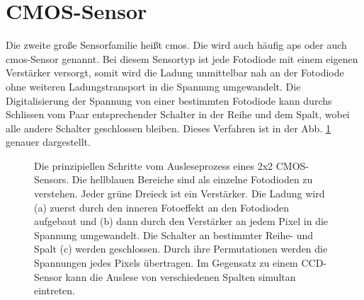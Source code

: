 \section{CMOS-Sensor}
\label{text:cmos_theorie}
Die zweite große Sensorfamilie heißt \gls{cmos}. Die wird auch häufig \gls{aps} oder auch \gls{cmos}-Sensor genannt. Bei diesem Sensortyp ist jede Fotodiode mit einem eigenen Verstärker versorgt, somit wird die Ladung unmittelbar nah an der Fotodiode ohne weiteren Ladungstransport in die Spannung umgewandelt. Die Digitalisierung der Spannung von einer bestimmten Fotodiode kann durchs Schlissen vom Paar entsprechender Schalter in der Reihe und dem Spalt, wobei alle andere Schalter geschlossen bleiben. Dieses Verfahren ist in der Abb. \ref{fig:cmos_scheme} genauer dargestellt.
\begin{figure}[H]
    \centering
    \hfill
    \hfill
    \caption{Die prinzipiellen Schritte vom Ausleseprozess eines 2x2 CMOS-Sensors. Die hellblauen Bereiche sind als einzelne Fotodioden zu verstehen. Jeder grüne Dreieck ist ein Verstärker. Die Ladung wird (a) zuerst durch den inneren Fotoeffekt an den Fotodioden aufgebaut und (b) dann durch den Verstärker an jedem Pixel in die Spannung umgewandelt. Die Schalter an bestimmter Reihe- und Spalt (c) werden geschlossen. Durch ihre Permutationen werden die Spannungen jedes Pixels übertragen. Im Gegensatz zu einem CCD-Sensor kann die Auslese von verschiedenen Spalten simultan eintreten.}
    \label{fig:cmos_scheme}
\end{figure}
